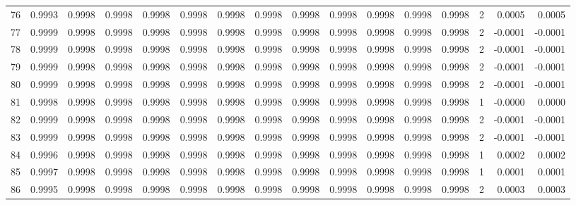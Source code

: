 \begin{tabular}{lrrrrrrrrrrrrrrr}
76  &      0.9993 &  0.9998 &  0.9998 &  0.9998 &  0.9998 &  0.9998 &  0.9998 &  0.9998 &  0.9998 &  0.9998 &   0.9998 &     0.9998 &      2 &                    0.0005 &                     0.0005 \\
77  &      0.9999 &  0.9998 &  0.9998 &  0.9998 &  0.9998 &  0.9998 &  0.9998 &  0.9998 &  0.9998 &  0.9998 &   0.9998 &     0.9998 &      2 &                   -0.0001 &                    -0.0001 \\
78  &      0.9999 &  0.9998 &  0.9998 &  0.9998 &  0.9998 &  0.9998 &  0.9998 &  0.9998 &  0.9998 &  0.9998 &   0.9998 &     0.9998 &      2 &                   -0.0001 &                    -0.0001 \\
79  &      0.9999 &  0.9998 &  0.9998 &  0.9998 &  0.9998 &  0.9998 &  0.9998 &  0.9998 &  0.9998 &  0.9998 &   0.9998 &     0.9998 &      2 &                   -0.0001 &                    -0.0001 \\
80  &      0.9999 &  0.9998 &  0.9998 &  0.9998 &  0.9998 &  0.9998 &  0.9998 &  0.9998 &  0.9998 &  0.9998 &   0.9998 &     0.9998 &      2 &                   -0.0001 &                    -0.0001 \\
81  &      0.9998 &  0.9998 &  0.9998 &  0.9998 &  0.9998 &  0.9998 &  0.9998 &  0.9998 &  0.9998 &  0.9998 &   0.9998 &     0.9998 &      1 &                   -0.0000 &                     0.0000 \\
82  &      0.9999 &  0.9998 &  0.9998 &  0.9998 &  0.9998 &  0.9998 &  0.9998 &  0.9998 &  0.9998 &  0.9998 &   0.9998 &     0.9998 &      2 &                   -0.0001 &                    -0.0001 \\
83  &      0.9999 &  0.9998 &  0.9998 &  0.9998 &  0.9998 &  0.9998 &  0.9998 &  0.9998 &  0.9998 &  0.9998 &   0.9998 &     0.9998 &      2 &                   -0.0001 &                    -0.0001 \\
84  &      0.9996 &  0.9998 &  0.9998 &  0.9998 &  0.9998 &  0.9998 &  0.9998 &  0.9998 &  0.9998 &  0.9998 &   0.9998 &     0.9998 &      1 &                    0.0002 &                     0.0002 \\
85  &      0.9997 &  0.9998 &  0.9998 &  0.9998 &  0.9998 &  0.9998 &  0.9998 &  0.9998 &  0.9998 &  0.9998 &   0.9998 &     0.9998 &      1 &                    0.0001 &                     0.0001 \\
86  &      0.9995 &  0.9998 &  0.9998 &  0.9998 &  0.9998 &  0.9998 &  0.9998 &  0.9998 &  0.9998 &  0.9998 &   0.9998 &     0.9998 &      2 &                    0.0003 &                     0.0003 \\

\end{tabular}
